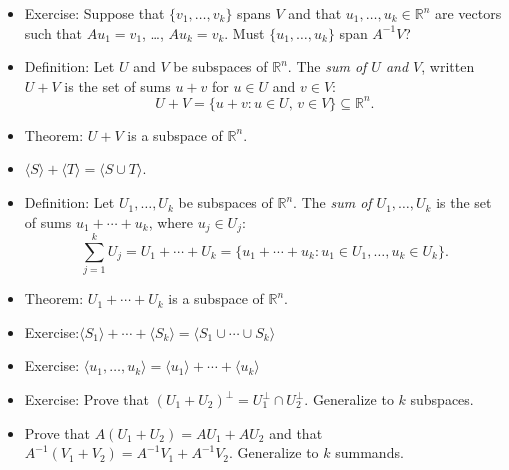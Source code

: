 \documentclass{amsart}
\newcommand{\RR}{\mathbb{R}}
\begin{document}
\begin{itemize}
\item Exercise: Suppose that $\{v_1,\ldots,v_k\}$ spans $V$ and that $u_1,\ldots,u_k\in\RR^n$ are vectors such that $Au_1=v_1$, \ldots, $Au_k=v_k$.
Must $\{u_1,\ldots,u_k\}$ span $A^{-1}V$?

\item Definition: Let $U$ and $V$ be subspaces of $\RR^n$.
The \emph{sum of $U$ and $V$}, written $U + V$ is the set of sums $u+v$ for $u\in U$ and $v\in V$:
$$
U + V = \{u + v : u\in U,\,v\in V\}\subseteq\RR^n.
$$

\item Theorem: $U+ V$ is a subspace of $\RR^n$.

\item $\langle S\rangle + \langle T\rangle = \langle S\cup T\rangle$.

\item Definition: Let $U_1,\ldots,U_k$ be subspaces of $\RR^n$. The \emph{sum of $U_1, \ldots, U_k$} is the set of sums $u_1+\cdots+u_k$, where $u_j\in U_j$:
$$
\sum_{j=1}^k U_j = U_1+\cdots + U_k = \{u_1+\cdots + u_k : u_1\in U_1,\ldots, u_k\in U_k\}.
$$ 

\item Theorem: $U_1+\cdots + U_k$ is a subspace of $\RR^n$.

\item Exercise:$\langle S_1\rangle + \cdots + \langle S_k\rangle = \langle S_1\cup\cdots\cup S_k\rangle$ 

\item Exercise: $\langle u_1,\ldots,u_k\rangle = \langle u_1\rangle + \cdots + \langle u_k\rangle$

\item Exercise: Prove that $(U_1+U_2)^\perp = U_1^\perp\cap U_2^\perp$. Generalize to $k$ subspaces.


\item Prove that $A(U_1+U_2)=AU_1 + AU_2$ and that $A^{-1}(V_1+V_2)=A^{-1}V_1 + A^{-1}V_2$.
Generalize to $k$ summands.
\end{itemize}
\end{document}
